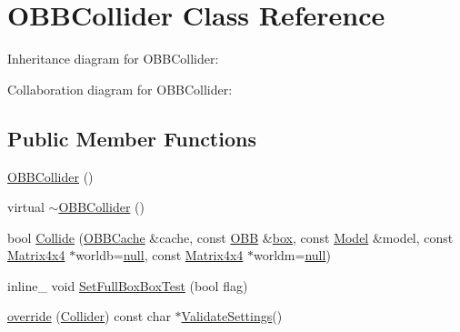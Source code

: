 \hypertarget{class_o_b_b_collider}{\section{O\+B\+B\+Collider Class Reference}
\label{class_o_b_b_collider}
}


Inheritance diagram for O\+B\+B\+Collider\+:


Collaboration diagram for O\+B\+B\+Collider\+:
\subsection*{Public Member Functions}
\begin{DoxyCompactItemize}
\item 
\hyperlink{class_o_b_b_collider_aebdd293adf48509ccd61b4cb11cf5e6c}{O\+B\+B\+Collider} ()
\item 
virtual \hyperlink{class_o_b_b_collider_ae9de47fc270d02d90fa5304690797c40}{$\sim$\+O\+B\+B\+Collider} ()
\item 
bool \hyperlink{class_o_b_b_collider_a243f4dd2ddba99e708b1da21ff44f82a}{Collide} (\hyperlink{struct_o_b_b_cache}{O\+B\+B\+Cache} \&cache, const \hyperlink{class_o_b_b}{O\+B\+B} \&\hyperlink{structbox}{box}, const \hyperlink{class_model}{Model} \&model, const \hyperlink{class_matrix4x4}{Matrix4x4} $\ast$worldb=\hyperlink{_ice_types_8h_ac97b8ee753e4405397a42ad5799b0f9e}{null}, const \hyperlink{class_matrix4x4}{Matrix4x4} $\ast$worldm=\hyperlink{_ice_types_8h_ac97b8ee753e4405397a42ad5799b0f9e}{null})
\item 
inline\+\_\+ void \hyperlink{class_o_b_b_collider_a938d1253a6ec0db3adc98aac49cb0e00}{Set\+Full\+Box\+Box\+Test} (bool flag)
\item 
\hyperlink{class_o_b_b_collider_ad59ff02a25c37bfdf32aee68e614da70}{override} (\hyperlink{class_collider}{Collider}) const char $\ast$\hyperlink{class_collider_a225d4861b2184336433894174c6e3e2d}{Validate\+Settings}()
\end{DoxyCompactItemize}
